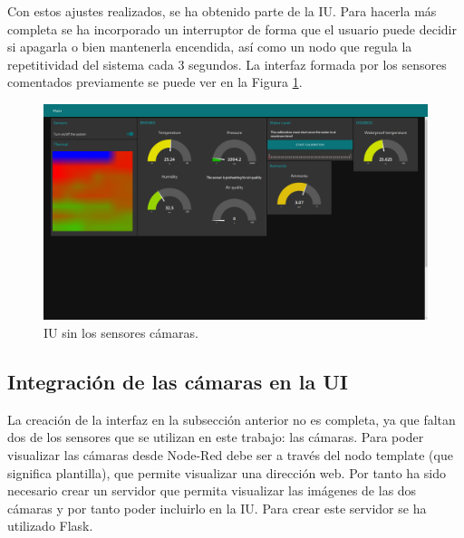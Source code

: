 Con estos ajustes realizados, se ha obtenido parte de la IU. Para hacerla más completa se ha incorporado un interruptor de forma que el usuario puede decidir si apagarla o bien mantenerla encendida, así como un nodo que regula la repetitividad del sistema cada 3 segundos. La interfaz formada por los sensores comentados previamente se puede ver en la Figura \ref{fig:ui_nocams}.
\begin{figure} [h!]
  \begin{center}
    \includegraphics[width=16cm]{figs/ui_nocams}
  \end{center}
  \caption{IU sin los sensores cámaras.}
  \label{fig:ui_nocams}
\end{figure}

\subsection{Integración de las cámaras en la UI}
La creación de la interfaz en la subsección anterior no es completa, ya que faltan dos de los sensores que se utilizan en este trabajo: las cámaras. Para poder visualizar las cámaras desde Node-Red debe ser a través del nodo template (que significa plantilla), que permite visualizar una dirección web. Por tanto ha sido necesario crear un servidor que permita visualizar las imágenes de las dos cámaras y por tanto poder incluirlo en la IU. Para crear este servidor se ha utilizado Flask.\\

